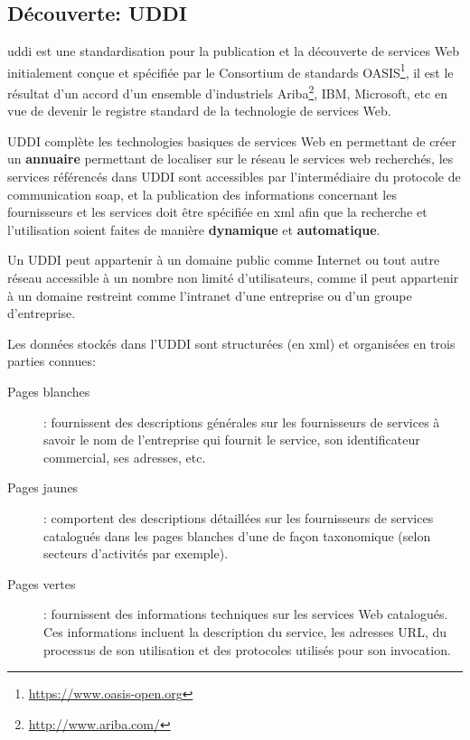   \subsection{Découverte: UDDI}
  \label{sec:uddi}
  \acrshort{uddi} \cite{clement2004uddi} est une standardisation pour
  la publication et la découverte de services Web initialement conçue
  et spécifiée par le Consortium de standards
  OASIS\footnote{\url{https://www.oasis-open.org}}, il est le résultat
  d'un accord d'un ensemble d'industriels
  Ariba\footnote{\url{http://www.ariba.com/}}, IBM, Microsoft, etc en
  vue de devenir le registre standard de la technologie de services
  Web.

  \textsc{UDDI} complète les technologies basiques de services Web en
  permettant de créer un \textbf{annuaire} permettant de localiser sur
  le réseau le services web recherchés, les services référencés dans
  \textsc{UDDI} sont accessibles par l'intermédiaire du protocole de
  communication \acrshort{soap}, et la publication des informations
  concernant les fournisseurs et les services doit être spécifiée en
  \acrshort{xml} afin que la recherche et l'utilisation soient faites de
  manière \textbf{dynamique} et \textbf{automatique}.

  Un \textsc{UDDI} peut appartenir à un domaine public comme Internet
  ou tout autre réseau accessible à un nombre non limité
  d'utilisateurs, comme il peut appartenir à un domaine restreint
  comme l'intranet d'une entreprise ou d'un groupe d'entreprise.


  Les données stockés dans l'\textsc{UDDI} sont structurées (en
  \acrshort{xml}) et organisées en trois parties connues:

  \SpecialItem
  \renewcommand{\descriptionlabel}[1]{\hspace{1cm}\texttt{#1}}
  \begin{description}
    \item[Pages blanches]: fournissent des descriptions générales sur
      les fournisseurs de services à savoir le nom de l'entreprise qui
      fournit le service, son identificateur commercial, ses adresses,
      etc.

    \item[Pages jaunes]: comportent des descriptions détaillées sur
      les fournisseurs de services catalogués dans les pages blanches
      d'une de façon taxonomique (selon secteurs d'activités par
      exemple).

    \item[Pages vertes]: fournissent des informations techniques sur
      les services Web catalogués. Ces informations incluent la
      description du service, les adresses \textsc{URL}, du processus
      de son utilisation et des protocoles utilisés pour son
      invocation.
  \end{description}

